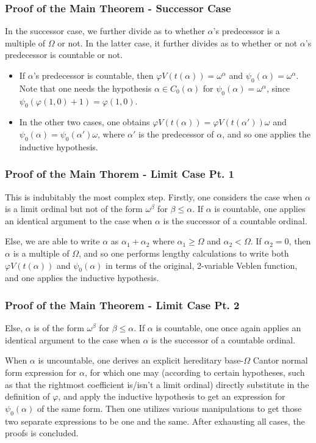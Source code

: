 \documentclass{beamer}
\begin{document}
\begin{frame}
\frametitle{Proof of the Main Theorem - Successor Case}
In the successor case, we further divide as to whether $\alpha$'s predecessor is a multiple of $\Omega$ or not. In the latter case, it further divides as to whether or not $\alpha$'s predecessor is countable or not. \pause

\begin{itemize}
    \item If $\alpha$'s predecessor is countable, then $\varphi V(t(\alpha)) = \omega^\alpha$ and $\psi_0(\alpha) = \omega^\alpha$. Note that one needs the hypothesis $\alpha \in C_0(\alpha)$ for $\psi_0(\alpha) = \omega^\alpha$, since $\psi_0(\varphi(1,0)+1) = \varphi(1,0)$.
    \item In the other two cases, one obtains $\varphi V(t(\alpha)) = \varphi V(t(\alpha')) \omega$ and $\psi_0(\alpha) = \psi_0(\alpha') \omega$, where $\alpha'$ is the predecessor of $\alpha$, and so one applies the inductive hypothesis.
\end{itemize}
\end{frame}

\begin{frame}
\frametitle{Proof of the Main Thorem - Limit Case Pt. 1}
This is indubitably the most complex step. Firstly, one considers the case when $\alpha$ is a limit ordinal but not of the form $\omega^\beta$ for $\beta \leq \alpha$. If $\alpha$ is countable, one applies an identical argument to the case when $\alpha$ is the successor of a countable ordinal. \pause

Else, we are able to write $\alpha$ as $\alpha_1 + \alpha_2$ where $\alpha_1 \geq \Omega$ and $\alpha_2 < \Omega$. If $\alpha_2 = 0$, then $\alpha$ is a multiple of $\Omega$, and so one performs lengthy calculations to write both $\varphi V(t(\alpha))$ and $\psi_0(\alpha)$ in terms of the original, 2-variable Veblen function, and one applies the inductive hypothesis.
\end{frame}

\begin{frame}
\frametitle{Proof of the Main Theorem - Limit Case Pt. 2}
Else, $\alpha$ is of the form $\omega^\beta$ for $\beta \leq \alpha$. If $\alpha$ is countable, one once again applies an identical argument to the case when $\alpha$ is the successor of a countable ordinal. \pause

When $\alpha$ is uncountable, one derives an explicit hereditary base-$\Omega$ Cantor normal form expression for $\alpha$, for which one may (according to certain hypotheses, such as that the rightmost coefficient is/isn't a limit ordinal) directly substitute in the definition of $\varphi$, and apply the inductive hypothesis to get an expression for $\psi_0(\alpha)$ of the same form. Then one utilizes various manipulations to get those two separate expressions to be one and the same. After exhausting all cases, the proofs is concluded.
\end{frame}
\end{document}
